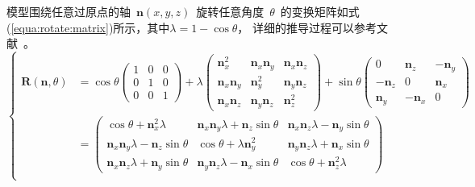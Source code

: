 模型围绕任意过原点的轴~$\bm{n}(x, y,
z)$~旋转任意角度~$\theta$~的变换矩阵如式(\ref{equa:rotate:matrix})所示，其中$\lambda
= 1-\cos\theta$，
详细的推导过程可以参考文献~。
\begin{equation}
\left\{
    \begin{array}{ll}
    \bm{R}(\bm{n},\theta) 
    &= 
          \cos\theta \begin{pmatrix}
                      1 & 0 & 0 \\
                      0 & 1 & 0 \\
                      0 & 0 & 1
                     \end{pmatrix}
          + \lambda \begin{pmatrix}
                    \bm{n}_x^2 & \bm{n}_x\bm{n}_y & \bm{n}_x\bm{n}_z \\
                    \bm{n}_x\bm{n}_y & \bm{n}_y^2 & \bm{n}_y\bm{n}_z \\
                    \bm{n}_x\bm{n}_z & \bm{n}_y\bm{n}_z & \bm{n}_z^2 
                    \end{pmatrix}
          + \sin\theta \begin{pmatrix}
                      0 & \bm{n}_z & -\bm{n}_y \\
                      -\bm{n}_z & 0 & \bm{n}_x \\
                      \bm{n}_y & -\bm{n}_x & 0
                      \end{pmatrix}
          \\
    ~&=  
        \begin{pmatrix}
              \cos\theta+\bm{n}_x^2\lambda & \bm{n}_x\bm{n}_y\lambda + \bm{n}_z\sin\theta & \bm{n}_x\bm{n}_z\lambda-\bm{n}_y\sin\theta \\
              \bm{n}_x\bm{n}_y\lambda - \bm{n}_z\sin\theta & \cos\theta+\lambda\bm{n}_y^2 & \bm{n}_y\bm{n}_z\lambda+\bm{n}_x\sin\theta \\
              \bm{n}_x\bm{n}_z\lambda + \bm{n}_y\sin\theta & \bm{n}_y\bm{n}_z\lambda - \bm{n}_x\sin\theta &  \cos\theta+\bm{n}_z^2\lambda 
          \end{pmatrix} \\
  \end{array}
\right.
\label{equa:rotate:matrix}
\end{equation}

